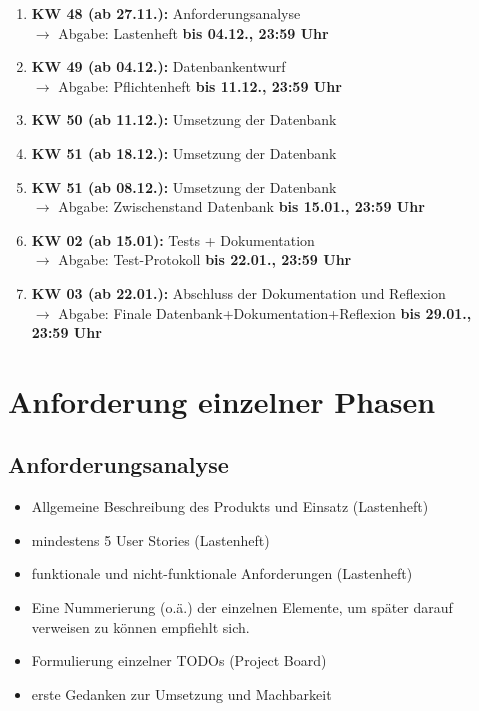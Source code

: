 \begin{enumerate}
    \item \textbf{KW 48 (ab 27.11.):} Anforderungsanalyse\\
       $\rightarrow$  Abgabe: Lastenheft \textbf{bis 04.12., 23:59 Uhr}
    \item \textbf{KW 49 (ab 04.12.):} Datenbankentwurf\\
       $\rightarrow$  Abgabe: Pflichtenheft \textbf{bis 11.12., 23:59 Uhr}
    \item \textbf{KW 50 (ab 11.12.):} Umsetzung der Datenbank
    \item \textbf{KW 51 (ab 18.12.):} Umsetzung der Datenbank\\
    \item \textbf{KW 51 (ab 08.12.):} Umsetzung der Datenbank\\
       $\rightarrow$  Abgabe: Zwischenstand Datenbank \textbf{bis 15.01., 23:59 Uhr}
    \item \textbf{KW 02 (ab 15.01):} Tests + Dokumentation\\
       $\rightarrow$  Abgabe: Test-Protokoll \textbf{bis 22.01., 23:59 Uhr}
    \item \textbf{KW 03 (ab 22.01.):} Abschluss der Dokumentation und Reflexion\\
       $\rightarrow$  Abgabe: Finale Datenbank+Dokumentation+Reflexion \textbf{bis 29.01., 23:59 Uhr}
\end{enumerate}

\section{Anforderung einzelner Phasen}

\subsection{Anforderungsanalyse}
\begin{itemize}
    \item Allgemeine Beschreibung des Produkts und Einsatz (Lastenheft)
    \item mindestens 5 User Stories (Lastenheft)
    \item funktionale und nicht-funktionale Anforderungen (Lastenheft)
    \item Eine Nummerierung (o.ä.) der einzelnen Elemente, um später darauf verweisen zu können empfiehlt sich.
    \item Formulierung einzelner TODOs (Project Board)
    \item erste Gedanken zur Umsetzung und Machbarkeit
\end{itemize}

